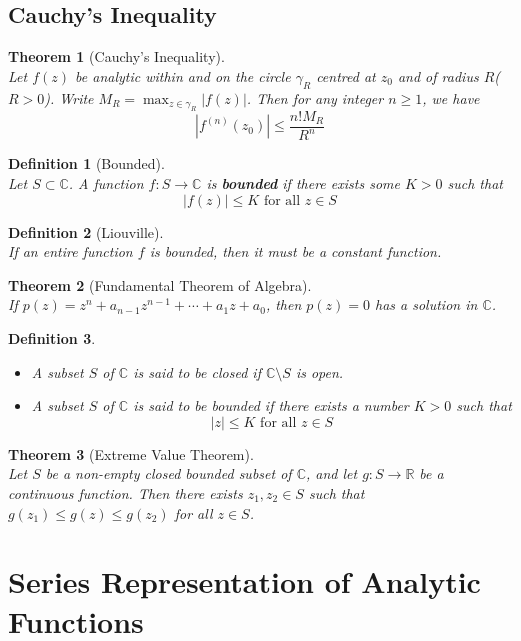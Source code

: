 \documentclass[12pt]{article}
\newtheorem{definition}{Definition}[section]
\newtheorem{theorem}{Theorem}[section]
\theoremstyle{definition}
\begin{document}
\subsection{Cauchy's Inequality}
\begin{theorem}[Cauchy's Inequality]
\hfill\\\normalfont Let $f(z)$ be analytic within and on the circle $\gamma_R$ centred at $z_0$ and of radius $R$($R>0$). Write $M_R=\max_{z\in\gamma_{R}}|f(z)|$. Then for any integer $n\geq 1$, we have
\[
|f^{(n)}(z_0)|\leq \frac{n!M_R}{R^n}
\]
\end{theorem}
\begin{definition}[Bounded]
\hfill\\\normalfont Let $S\subset \mathbb{C}$. A function $f:S\to \mathbb{C}$ is \textbf{bounded} if there exists some $K>0$ such that
\[
|f(z)|\leq K \text{ for all }z\in S
\]
\end{definition}
\begin{definition}[Liouville]
\hfill\\\normalfont If an entire function $f$ is bounded, then it must be a constant function.
\end{definition}
\begin{theorem}[Fundamental Theorem of Algebra]
\hfill\\\normalfont If $p(z)=z^n + a_{n-1}z^{n-1}+ \cdots + a_1z + a_0$, then $p(z)=0$ has a solution in $\mathbb{C}$.
\end{theorem}
\begin{definition}
\begin{itemize}
	\item A subset $S$ of $\mathbb{C}$ is said to be closed if $\mathbb{C}\setminus S$ is open.
	\item A subset $S$ of $\mathbb{C}$ is said to be bounded if there exists a number $K>0$ such that 
\[
|z|\leq K \text{ for all }z\in S
\]
\end{itemize}
\end{definition}
\begin{theorem}[Extreme Value Theorem]
\hfill\\\normalfont Let $S$ be a non-empty closed bounded subset of $\mathbb{C}$, and let $g:S\to\mathbb{R}$ be a continuous function. Then there exists $z_1,z_2\in S$ such that $g(z_1)\leq g(z)\leq g(z_2)$ for all $z\in S$.
\end{theorem}
\clearpage
\section{Series Representation of Analytic Functions}
\end{document}
